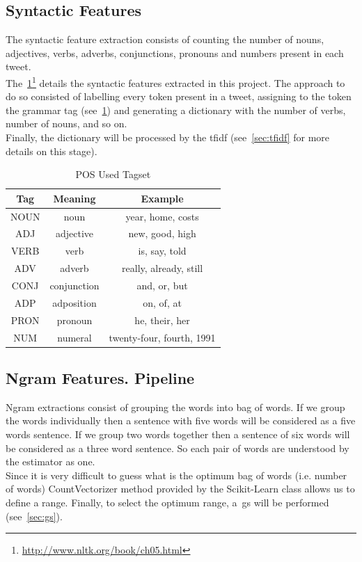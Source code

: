 \subsection{Syntactic Features}
The syntactic feature extraction consists of counting the number of nouns, adjectives, verbs, adverbs, conjunctions, pronouns and numbers present in each tweet.\\
The~\cref{tab:pos}\footnote{\url{http://www.nltk.org/book/ch05.html}} details the syntactic features extracted in this project. The approach to do so consisted of labelling every token present in a tweet, assigning to the token the grammar tag (see~\cref{tab:pos}) and generating a dictionary with the number of verbs, number of nouns, and so on.\\
Finally, the dictionary will be processed by the \ac{tfidf} (see~\cref{sec:tfidf} for more details on this stage).
\begin{table}[h!]
	\centering
	\begin{tabular}{||c c c||} 
		\hline
		\textbf{Tag} & \textbf{Meaning} & \textbf{Example} \\ [0.5ex] 
		\hline\hline
		NOUN & noun & year, home, costs \\ 
		ADJ & adjective & new, good, high \\
		VERB & verb & is, say, told \\
		ADV & adverb & really, already, still \\
		CONJ & conjunction & and, or, but \\
		ADP & adposition & on, of, at \\
		PRON & pronoun & he, their, her \\
		NUM & numeral & twenty-four, fourth, 1991 \\
		[1ex] 
		\hline
	\end{tabular}
	\caption[POS Tagset]{POS Used Tagset}
	\label{tab:pos}
\end{table}
\subsection{Ngram Features. Pipeline}
Ngram extractions consist of grouping the words into bag of words. If we group the words individually then a sentence with five words will be considered as a five words sentence. If we group two words together then a sentence of six words will be considered as a three word sentence. So each pair of words are understood by the estimator as one.\\
Since it is very difficult to guess what is the optimum bag of words (i.e. number of words) CountVectorizer method provided by the Scikit-Learn class allows us to define a range. Finally, to select the optimum range, a~\ac{gs} will be performed (see~\cref{sec:gs}).
